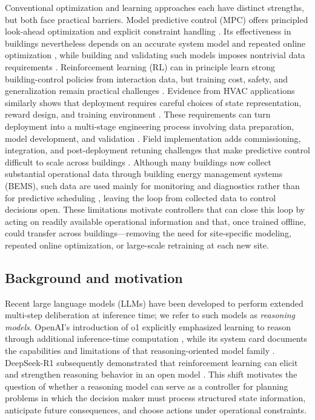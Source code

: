 \documentclass[11pt]{article}
\begin{document}
Conventional optimization and learning approaches each have distinct strengths, but both face practical barriers. Model predictive control (MPC) offers principled look-ahead optimization and explicit constraint handling \cite{ref:serale2018_mpc_energies}. Its effectiveness in buildings nevertheless depends on an accurate system model and repeated online optimization \cite{ref:drgona2020_mpc_buildings}, while building and validating such models imposes nontrivial data requirements \cite{ref:zhan2021_mpc_data_requirements}. Reinforcement learning (RL) can in principle learn strong building-control policies from interaction data, but training cost, safety, and generalization remain practical challenges \cite{ref:wang2020_rl_building_controls}. Evidence from HVAC applications similarly shows that deployment requires careful choices of state representation, reward design, and training environment \cite{ref:sierla2022_rl_hvac_energies}. These requirements can turn deployment into a multi-stage engineering process involving data preparation, model development, and validation \cite{ref:drgona2020_mpc_buildings}. Field implementation adds commissioning, integration, and post-deployment retuning challenges that make predictive control difficult to scale across buildings \cite{ref:saloux2025_mpc_field_implementations}. Although many buildings now collect substantial operational data through building energy management systems (BEMS), such data are used mainly for monitoring and diagnostics rather than for predictive scheduling \cite{ref:savadkoohi2024_predictive_control_data}, leaving the loop from collected data to control decisions open. These limitations motivate controllers that can close this loop by acting on readily available operational information and that, once trained offline, could transfer across buildings---removing the need for site-specific modeling, repeated online optimization, or large-scale retraining at each new site.
\subsection{Background and motivation}\label{subsec:background}
Recent large language models (LLMs) have been developed to perform extended multi-step deliberation at inference time; we refer to such models as \textit{reasoning models}. OpenAI's introduction of o1 explicitly emphasized learning to reason through additional inference-time computation \cite{ref:openai2024_learning_to_reason}, while its system card documents the capabilities and limitations of that reasoning-oriented model family \cite{ref:openai2024_o1_system_card}. DeepSeek-R1 subsequently demonstrated that reinforcement learning can elicit and strengthen reasoning behavior in an open model \cite{ref:deepseekr1_2025}. This shift motivates the question of whether a reasoning model can serve as a controller for planning problems in which the decision maker must process structured state information, anticipate future consequences, and choose actions under operational constraints.
\end{document}
